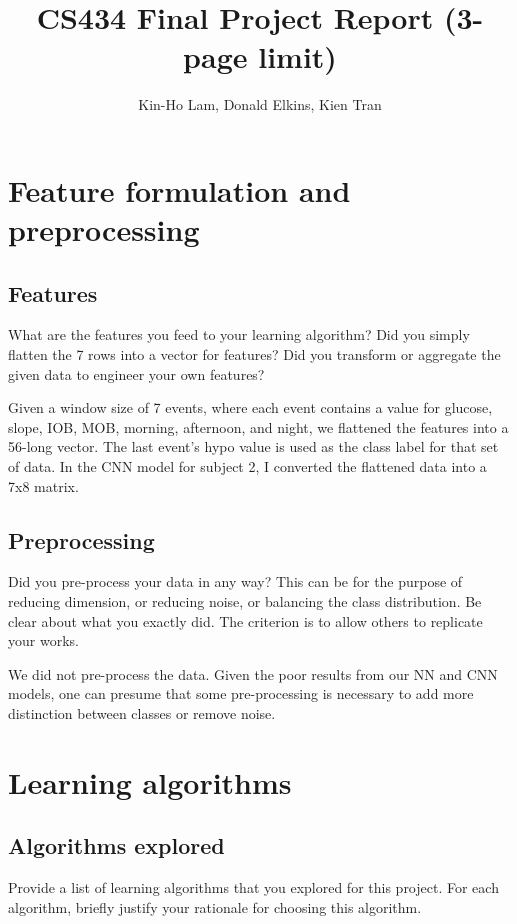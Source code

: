 \documentclass[11pt,a4paper]{article}
\title{CS434 Final Project Report (3-page limit)}
\author{Kin-Ho Lam, Donald Elkins, Kien Tran}
\date{}
\begin{document}
\maketitle
\section{Feature formulation and preprocessing}
\subsection{Features} What are the features you feed to your learning algorithm? Did you simply flatten the 7 rows into a vector for features? Did you transform or aggregate the given data to engineer your own features?



Given a window size of 7 events, where each event contains a value for glucose, slope, IOB, MOB, morning, afternoon, and night, we flattened the features into a 56-long vector.
The last event's hypo value is used as the class label for that set of data.
In the CNN model for subject 2, I converted the flattened data into a 7x8 matrix.

\subsection{Preprocessing}
Did you pre-process your data in any way? This can be for the purpose of reducing dimension, or reducing noise, or balancing the class distribution. Be clear about what you exactly did. The criterion is to allow others to replicate your works.

We did not pre-process the data.
Given the poor results from our NN and CNN models, one can presume that some pre-processing is necessary to add more distinction between classes or remove noise.


\section{Learning algorithms}
\subsection{Algorithms explored}
Provide a list of learning algorithms that you explored for this project. For each algorithm, briefly justify your rationale for choosing this algorithm.
\end{document}
